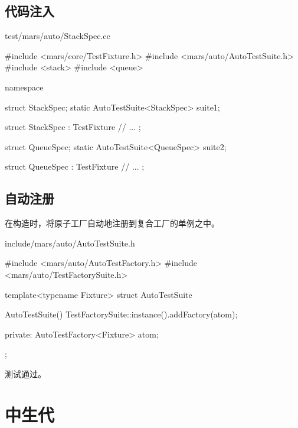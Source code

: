 \begin{content}
\subsection{代码注入}

\begin{nodiff}{test/mars/auto/StackSpec.cc}
 \begin{c++}
#include <mars/core/TestFixture.h>
#include <mars/auto/AutoTestSuite.h>
#include <stack>
#include <queue>

namespace {
  struct StackSpec;
  static AutoTestSuite<StackSpec> suite1;

  struct StackSpec : TestFixture {
    // ...
  };

  struct QueueSpec;
  static AutoTestSuite<QueueSpec> suite2;

  struct QueueSpec : TestFixture {
    // ...
  };  
}
 \end{c++}
\end{nodiff}

\subsection{自动注册}

在构造时，将原子工厂自动地注册到复合工厂的单例之中。

\begin{nodiff}{include/mars/auto/AutoTestSuite.h}
 \begin{c++}
#include <mars/auto/AutoTestFactory.h>
#include <mars/auto/TestFactorySuite.h>

template<typename Fixture>
struct AutoTestSuite {
  AutoTestSuite() {
    TestFactorySuite::instance().addFactory(atom);
  }

private:
  AutoTestFactory<Fixture> atom;
};
 \end{c++}
\end{nodiff}

测试通过。

\end{content}

\section{中生代}

